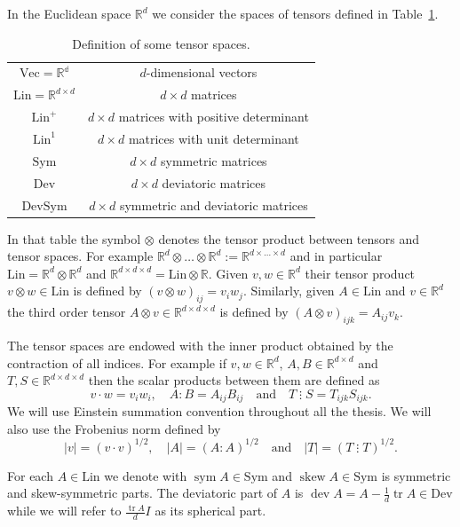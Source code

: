 \documentclass[a4paper,10pt,oneside]{amsbook}
\numberwithin{section}{chapter}
\numberwithin{equation}{chapter}
\theoremstyle{definition}
\DeclareMathOperator{\dev}{dev}
\DeclareMathOperator{\tr}{tr}
\DeclareMathOperator{\sym}{sym}
\DeclareMathOperator{\ske}{skew}
\newcommand{\threedots}{\mathbin{\vdots}}
\begin{document}
In the Euclidean space $\mathbb{R}^d$ we consider the spaces of tensors defined in Table~\ref{tab:tensors}.
\begin{table}
\caption{Definition of some tensor spaces.}
\label{tab:tensors}
\begin{tabular}{cc}
\toprule
$\text{Vec}=\mathbb{R^d}$ & $d$-dimensional vectors \\
$\text{Lin}=\mathbb{R}^{d\times d}$ & $d\times d$ matrices \\
$\text{Lin}^+$ & $d\times d$ matrices with positive determinant \\
$\text{Lin}^1$ & $d\times d$ matrices with unit determinant \\
$\text{Sym}$ & $d\times d$ symmetric matrices \\
$\text{Dev}$ & $d\times d$ deviatoric matrices \\
$\text{DevSym}$ & $d\times d$ symmetric and deviatoric matrices \\
\bottomrule
\end{tabular}
\end{table}
In that table the symbol $\otimes$ denotes the tensor product between tensors and tensor spaces. For example $\mathbb{R}^d\otimes\dots\otimes\mathbb{R}^d:=\mathbb{R}^{d\times\dots\times d}$ and in particular $\text{Lin}=\mathbb{R}^d\otimes\mathbb{R}^d$ and $\mathbb{R}^{d\times d\times d}=\text{Lin}\otimes\mathbb{R}$. Given $v,w\in\mathbb{R}^d$ their tensor product $v\otimes w\in\text{Lin}$ is defined by $(v\otimes w)_{ij}=v_iw_j$. Similarly, given $A\in\text{Lin}$ and $v\in\mathbb{R}^d$ the third order tensor $A\otimes v\in\mathbb{R}^{d\times d\times d}$ is defined by $(A\otimes v)_{ijk}=A_{ij}v_k$.

The tensor spaces are endowed with the inner product obtained by the contraction of all indices. For example if $v,w\in\mathbb{R}^d$, $A,B\in\mathbb{R}^{d\times d}$ and $T,S\in\mathbb{R}^{d\times d\times d}$ then the scalar products between them are defined as
\[
v\cdot w=v_iw_i,\quad A:B=A_{ij}B_{ij}\quad\text{and}\quad T\threedots S=T_{ijk}S_{ijk}.
\]
We will use Einstein summation convention throughout all the thesis. We will also use the Frobenius norm defined by
\[
|v|=(v\cdot v)^{1/2},\quad|A|=(A:A)^{1/2}\quad\text{and}\quad|T|=(T\threedots T)^{1/2}.
\]

For each $A\in\text{Lin}$ we denote with $\sym A\in\text{Sym}$ and $\ske A\in\text{Sym}$ is symmetric and skew-symmetric parts. The deviatoric part of $A$ is $\dev A=A-\frac{1}{d}\tr A\in\text{Dev}$ while we will refer to $\frac{\tr A}{d}I$ as its spherical part.
\end{document}
